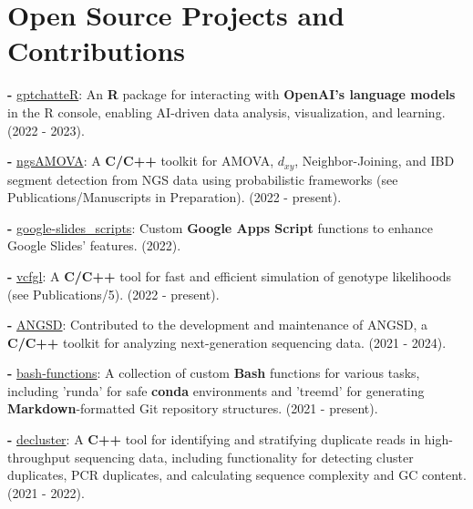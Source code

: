 \documentclass[letterpaper,10.5pt]{article}
\begin{document}
\section{Open Source Projects and Contributions}

\textbf{-}  \href{https://github.com/isinaltinkaya/gptchatteR}{gptchatteR}: An \textbf{R} package for interacting with \textbf{OpenAI's language models} in the R console, enabling AI-driven data analysis, visualization, and learning. (2022 - 2023). \\
\smallskip

\textbf{-}   \href{https://github.com/isinaltinkaya/ngsAMOVA}{ngsAMOVA}: A \textbf{C/C++} toolkit for AMOVA, $d_{xy}$, Neighbor-Joining, and IBD segment detection from NGS data using probabilistic frameworks (see Publications/Manuscripts in Preparation). (2022 - present). \\
\smallskip

\textbf{-}  \href{https://github.com/isinaltinkaya/google-slides_scripts}{google-slides\_scripts}: Custom \textbf{Google Apps Script} functions to enhance Google Slides' features. (2022). \\
\smallskip

\textbf{-}  \href{https://github.com/isinaltinkaya/vcfgl}{vcfgl}: A \textbf{C/C++} tool for fast and efficient simulation of genotype likelihoods (see Publications/5). (2022 - present). \\
\smallskip

\textbf{-}  \href{https://github.com/ANGSD/angsd}{ANGSD}: Contributed to the development and maintenance of ANGSD, a \textbf{C/C++} toolkit for analyzing next-generation sequencing data. (2021 - 2024). \\
\smallskip

\textbf{-}  \href{https://github.com/isinaltinkaya/bash-functions}{bash-functions}: A collection of custom \textbf{Bash} functions for various tasks, including 'runda' for safe \textbf{conda} environments and 'treemd' for generating \textbf{Markdown}-formatted Git repository structures. (2021 - present). \\
\smallskip

\textbf{-}  \href{https://github.com/ANGSD/decluster}{decluster}: A \textbf{C++} tool for identifying and stratifying duplicate reads in high-throughput sequencing data, including functionality for detecting cluster duplicates, PCR duplicates, and calculating sequence complexity and GC content. (2021 - 2022). \\
\smallskip
\end{document}
